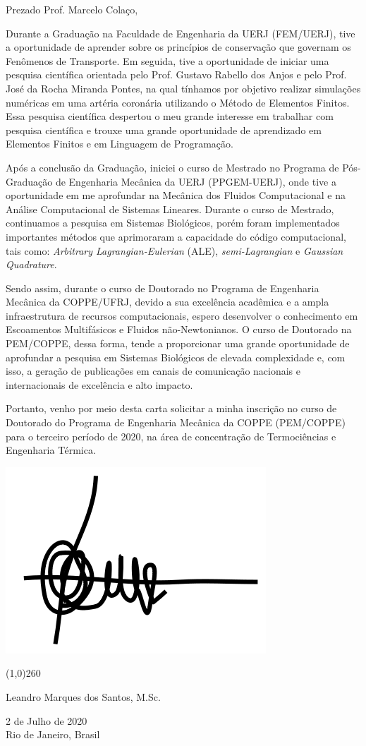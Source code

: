 Prezado Prof. Marcelo Colaço,

\bigskip
Durante a Graduação na Faculdade de Engenharia da UERJ (FEM/UERJ),
tive a oportunidade de aprender sobre os princípios de conservação
que governam os Fenômenos de Transporte.
Em seguida, tive a oportunidade de iniciar uma pesquisa científica
orientada pelo Prof. Gustavo Rabello dos Anjos e 
pelo Prof. José da Rocha Miranda Pontes,
na qual tínhamos por objetivo realizar simulações numéricas
em uma artéria coronária utilizando o Método de Elementos Finitos.
Essa pesquisa científica despertou o meu grande interesse em
trabalhar com pesquisa científica e trouxe uma grande oportunidade
de aprendizado em Elementos Finitos e em Linguagem de Programação.

\medskip
Após a conclusão da Graduação, iniciei o curso de Mestrado no 
Programa de Pós-Graduação de Engenharia Mecânica da UERJ (PPGEM-UERJ),
onde tive a oportunidade em me aprofundar
na Mecânica dos Fluidos Computacional e na Análise Computacional de
Sistemas Lineares.
Durante o curso de Mestrado, continuamos a pesquisa em Sistemas Biológicos,
porém foram implementados importantes métodos que aprimoraram a capacidade
do código computacional, tais como: 
\textit{Arbitrary Lagrangian-Eulerian} (ALE),
\textit{semi-Lagrangian} e
\textit{Gaussian Quadrature}.

\medskip
Sendo assim, durante o curso de Doutorado no Programa de Engenharia Mecânica da COPPE/UFRJ, 
devido a sua excelência acadêmica e 
a ampla infraestrutura de recursos computacionais,
espero desenvolver o conhecimento em Escoamentos Multifásicos e Fluidos não-Newtonianos. 
O curso de Doutorado na PEM/COPPE, dessa forma, tende a proporcionar uma grande oportunidade 
de aprofundar a pesquisa em Sistemas Biológicos de elevada complexidade
e, com isso, a geração de publicações em canais de comunicação nacionais
e internacionais de excelência e alto impacto.

\medskip
Portanto, venho por meio desta carta solicitar a minha inscrição
no curso de Doutorado do Programa de Engenharia Mecânica
da COPPE (PEM/COPPE) para o terceiro período de 2020,
na área de concentração de Termociências e Engenharia
Térmica.




\vspace{1cm}
\hspace{7.5cm}\includegraphics[scale=0.14]{figure/assinatura.png}

\begin{center}
\vspace{-1.2cm}
\line(1,0){260}

\smallskip
Leandro Marques dos Santos, M.Sc.

\medskip
\small 2 de Julho de 2020\\
\small Rio de Janeiro, Brasil

\end{center}

